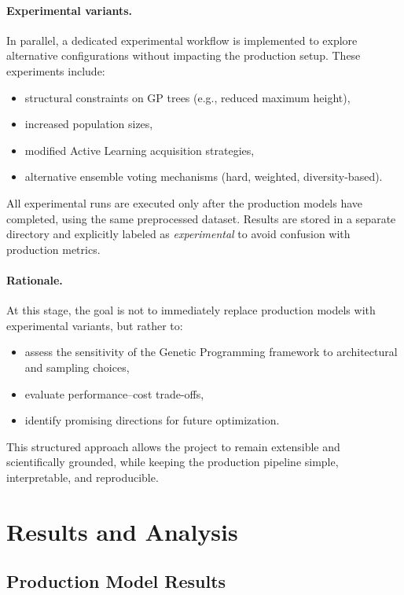 \documentclass[12pt,a4paper]{article}
\begin{document}
\paragraph{Experimental variants.}
In parallel, a dedicated experimental workflow is implemented to explore alternative configurations without impacting the production setup. These experiments include:
\begin{itemize}
    \item structural constraints on GP trees (e.g., reduced maximum height),
    \item increased population sizes,
    \item modified Active Learning acquisition strategies,
    \item alternative ensemble voting mechanisms (hard, weighted, diversity-based).
\end{itemize}

All experimental runs are executed only after the production models have completed, using the same preprocessed dataset. Results are stored in a separate directory and explicitly labeled as \emph{experimental} to avoid confusion with production metrics.

\medskip

\paragraph{Rationale.}
At this stage, the goal is not to immediately replace production models with experimental variants, but rather to:
\begin{itemize}
    \item assess the sensitivity of the Genetic Programming framework to architectural and sampling choices,
    \item evaluate performance--cost trade-offs,
    \item identify promising directions for future optimization.
\end{itemize}

This structured approach allows the project to remain extensible and scientifically grounded, while keeping the production pipeline simple, interpretable, and reproducible.

\section{Results and Analysis}

\subsection{Production Model Results}
\end{document}
